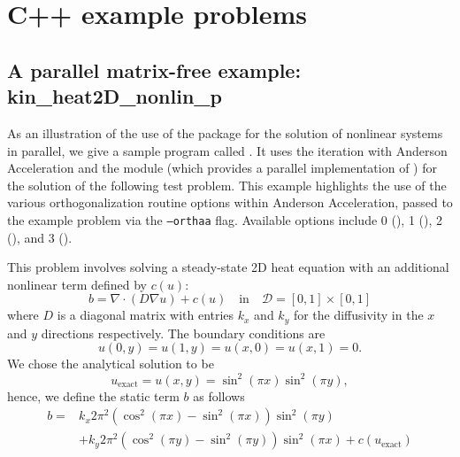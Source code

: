 \section{C++ example problems}\label{s:ex_cpp}

\subsection{A parallel matrix-free example: kin\_heat2D\_nonlin\_p}
\label{ss:kin_heat2D_nonlin_p}

As an illustration of the use of the {\kinsol} package for the solution of
nonlinear systems in parallel, we give a sample program called
.  It uses the {\kinsol}  iteration
with Anderson Acceleration and the {\nvecp} module (which provides a parallel
implementation of {\nvector}) for the solution of the following test problem.
This example highlights the use of the various orthogonalization routine options
within Anderson Acceleration, passed to the example problem via the
\texttt{--orthaa} flag. Available options include 0 (), 1
(), 2 (), and 3 ().

This problem involves solving a steady-state 2D heat equation with an additional
nonlinear term defined by $c(u)$:
\begin{equation}
  b = \nabla \cdot (D \nabla u) + c(u) \quad \text{in} \quad
  \mathcal{D} = [0,1] \times [0,1]
\end{equation}
where $D$ is a diagonal matrix with entries $k_x$ and $k_y$ for the diffusivity
in the $x$ and $y$ directions respectively. The boundary conditions are
\begin{equation}
  u(0,y) = u(1,y) = u(x,0) = u(x,1) = 0.
\end{equation}
We chose the analytical solution to be
\begin{equation}
  u_{\text{exact}} = u(x,y) = \sin^2(\pi x) \sin^2(\pi y),
\end{equation}
hence, we define the static term $b$ as follows
\begin{equation}
  \begin{aligned}
    b = &k_x 2 \pi^2 (\cos^2(\pi x) - \sin^2(\pi x)) \sin^2(\pi y) \\
        &+ k_y 2 \pi^2 (\cos^2(\pi y) - \sin^2(\pi y)) \sin^2(\pi x)
        + c(u_{\text{exact}})
  \end{aligned}
\end{equation}

